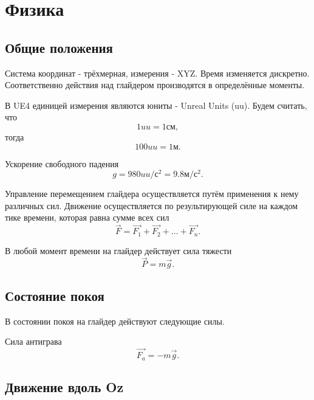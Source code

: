 \documentclass[a4paper,12pt]{report}
\newcommand{\ue}{UE4\xspace}
\begin{document}
\chapter{Физика}

\section{Общие положения}

Система координат - трёхмерная, измерения - XYZ. Время изменяется дискретно. Соответственно действия над глайдером производятся в определённые моменты.

В \ue единицей измерения являются юниты - Unreal Units (uu). Будем считать, что
\begin{equation}
1uu = 1см,
\end{equation}
тогда 
\begin{equation}
100uu = 1м.
\end{equation}

Ускорение свободного падения
\begin{equation}
g = 980uu/с^2 = 9.8м/с^2.
\end{equation}

Управление перемещением глайдера осуществляется путём применения к нему различных сил. Движение осуществляется по результирующей силе на каждом тике времени, которая равна сумме всех сил
\begin{equation}
\vec{F} = \vec{F_1} + \vec{F_2} + \dots + \vec{F_n}.
\end{equation}

В любой момент времени на глайдер действует сила тяжести
\begin{equation}
\vec{P} = m\vec{g}.
\end{equation}

\section{Состояние покоя}

В состоянии покоя на глайдер действуют следующие силы.

Сила антиграва
\begin{equation}
\vec{F_a} =
-m\vec{g}.
\end{equation}

\section{Движение вдоль Oz}
\end{document}
